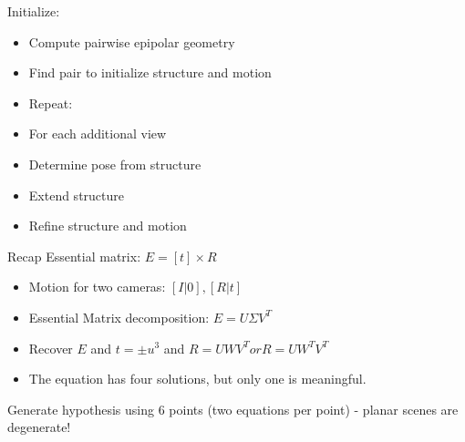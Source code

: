 Initialize:
\begin{itemize}
\item Compute pairwise epipolar geometry
\item Find pair to initialize structure and motion
\item Repeat:
\item For each additional view
\item Determine pose from structure 
\item Extend structure
\item Refine structure and motion
\end{itemize}

Recap Essential matrix:  $E=[t]\times R$

\begin{itemize}
\item  Motion for two cameras: $[I|0], [R|t]$
\item Essential Matrix decomposition: $E= U \Sigma V^T$
\item Recover $E$ and $t = \pm u^3$ and $R=UWV^T or R=UW^TV^T$
\item The equation has four solutions, but only one is meaningful. 
\end{itemize}


Generate hypothesis using 6 points (two equations per point) - planar scenes are degenerate!

